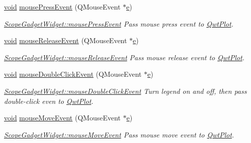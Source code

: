 \begin{DoxyCompactItemize}
\item 
\hyperlink{group___u_a_v_objects_plugin_ga444cf2ff3f0ecbe028adce838d373f5c}{void} \hyperlink{group__scopeplugin_ga11281413c7e13a020d557822db2eaae2}{mouse\-Press\-Event} (Q\-Mouse\-Event $\ast$\hyperlink{_o_p_plots_8m_a9425be9aab51621e317ba7ade564b570}{e})
\begin{DoxyCompactList}\small\item\em \hyperlink{group__scopeplugin_ga11281413c7e13a020d557822db2eaae2}{Scope\-Gadget\-Widget\-::mouse\-Press\-Event} Pass mouse press event to \hyperlink{class_qwt_plot}{Qwt\-Plot}. \end{DoxyCompactList}\item 
\hyperlink{group___u_a_v_objects_plugin_ga444cf2ff3f0ecbe028adce838d373f5c}{void} \hyperlink{group__scopeplugin_ga079408e64c98a63ff0459120988360e7}{mouse\-Release\-Event} (Q\-Mouse\-Event $\ast$\hyperlink{_o_p_plots_8m_a9425be9aab51621e317ba7ade564b570}{e})
\begin{DoxyCompactList}\small\item\em \hyperlink{group__scopeplugin_ga079408e64c98a63ff0459120988360e7}{Scope\-Gadget\-Widget\-::mouse\-Release\-Event} Pass mouse release event to \hyperlink{class_qwt_plot}{Qwt\-Plot}. \end{DoxyCompactList}\item 
\hyperlink{group___u_a_v_objects_plugin_ga444cf2ff3f0ecbe028adce838d373f5c}{void} \hyperlink{group__scopeplugin_ga6b657bc6aec409845f48f29bb6fb508d}{mouse\-Double\-Click\-Event} (Q\-Mouse\-Event $\ast$\hyperlink{_o_p_plots_8m_a9425be9aab51621e317ba7ade564b570}{e})
\begin{DoxyCompactList}\small\item\em \hyperlink{group__scopeplugin_ga6b657bc6aec409845f48f29bb6fb508d}{Scope\-Gadget\-Widget\-::mouse\-Double\-Click\-Event} Turn legend on and off, then pass double-\/click even to \hyperlink{class_qwt_plot}{Qwt\-Plot}. \end{DoxyCompactList}\item 
\hyperlink{group___u_a_v_objects_plugin_ga444cf2ff3f0ecbe028adce838d373f5c}{void} \hyperlink{group__scopeplugin_ga3a4b3097cd04ab00ad3bbdd290186696}{mouse\-Move\-Event} (Q\-Mouse\-Event $\ast$\hyperlink{_o_p_plots_8m_a9425be9aab51621e317ba7ade564b570}{e})
\begin{DoxyCompactList}\small\item\em \hyperlink{group__scopeplugin_ga3a4b3097cd04ab00ad3bbdd290186696}{Scope\-Gadget\-Widget\-::mouse\-Move\-Event} Pass mouse move event to \hyperlink{class_qwt_plot}{Qwt\-Plot}. \end{DoxyCompactList}\item 

\end{DoxyCompactItemize}
